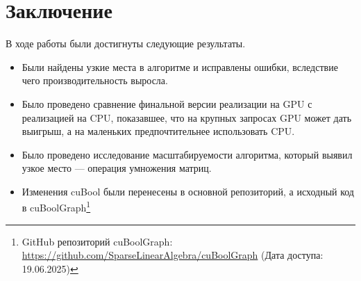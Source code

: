 
\section{Заключение}

В ходе работы были достигнуты следующие результаты.

\begin{itemize}
    \item Были найдены узкие места в алгоритме и исправлены ошибки, вследствие чего производительность выросла.
    \item Было проведено сравнение финальной версии реализации на GPU с реализацией на CPU, показавшее, что на крупных запросах GPU может дать выигрыш, а на маленьких предпочтительнее использовать CPU.
    \item Было проведено исследование масштабируемости алгоритма, который выявил узкое место --- операция умножения матриц.
    \item Изменения cuBool были перенесены в основной репозиторий, а исходный код в cuBoolGraph\footnote{GitHub репозиторий cuBoolGraph: \url{https://github.com/SparseLinearAlgebra/cuBoolGraph} (Дата доступа: 19.06.2025)}
\end{itemize}
